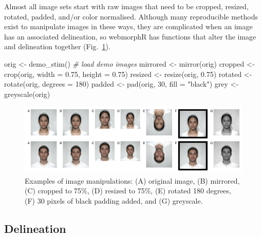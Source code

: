 \documentclass[
  doc,floatsintext]{apa6}
\newenvironment{Shaded}{\begin{snugshade}}{\end{snugshade}}
\newcommand{\AttributeTok}[1]{\textcolor[rgb]{0.77,0.63,0.00}{#1}}
\newcommand{\CommentTok}[1]{\textcolor[rgb]{0.56,0.35,0.01}{\textit{#1}}}
\newcommand{\DecValTok}[1]{\textcolor[rgb]{0.00,0.00,0.81}{#1}}
\newcommand{\FloatTok}[1]{\textcolor[rgb]{0.00,0.00,0.81}{#1}}
\newcommand{\FunctionTok}[1]{\textcolor[rgb]{0.00,0.00,0.00}{#1}}
\newcommand{\NormalTok}[1]{#1}
\newcommand{\OtherTok}[1]{\textcolor[rgb]{0.56,0.35,0.01}{#1}}
\newcommand{\StringTok}[1]{\textcolor[rgb]{0.31,0.60,0.02}{#1}}
\begin{document}
Almost all image sets start with raw images that need to be cropped, resized, rotated, padded, and/or color normalised. Although many reproducible methods exist to manipulate images in these ways, they are complicated when an image has an associated delineation, so webmorphR has functions that alter the image and delineation together (Fig.~\ref{fig:editing}).

\begin{Shaded}
\begin{Highlighting}[]
\NormalTok{orig }\OtherTok{\textless{}{-}} \FunctionTok{demo\_stim}\NormalTok{() }\CommentTok{\# load demo images}
\NormalTok{mirrored }\OtherTok{\textless{}{-}} \FunctionTok{mirror}\NormalTok{(orig)}
\NormalTok{cropped  }\OtherTok{\textless{}{-}} \FunctionTok{crop}\NormalTok{(orig, }\AttributeTok{width =} \FloatTok{0.75}\NormalTok{, }\AttributeTok{height =} \FloatTok{0.75}\NormalTok{)}
\NormalTok{resized  }\OtherTok{\textless{}{-}} \FunctionTok{resize}\NormalTok{(orig, }\FloatTok{0.75}\NormalTok{)}
\NormalTok{rotated  }\OtherTok{\textless{}{-}} \FunctionTok{rotate}\NormalTok{(orig, }\AttributeTok{degrees =} \DecValTok{180}\NormalTok{)}
\NormalTok{padded   }\OtherTok{\textless{}{-}} \FunctionTok{pad}\NormalTok{(orig, }\DecValTok{30}\NormalTok{, }\AttributeTok{fill =} \StringTok{"black"}\NormalTok{)}
\NormalTok{grey     }\OtherTok{\textless{}{-}} \FunctionTok{greyscale}\NormalTok{(orig)}
\end{Highlighting}
\end{Shaded}



\begin{figure}
\includegraphics[width=1\linewidth]{index_files/figure-latex/editing-1} \caption{Examples of image manipulations: (A) original image, (B) mirrored, (C) cropped to 75\%, (D) resized to 75\%, (E) rotated 180 degrees, (F) 30 pixels of black padding added, and (G) greyscale.}\label{fig:editing}
\end{figure}

\hypertarget{delineation}{%
\subsection{Delineation}\label{delineation}}
\end{document}
